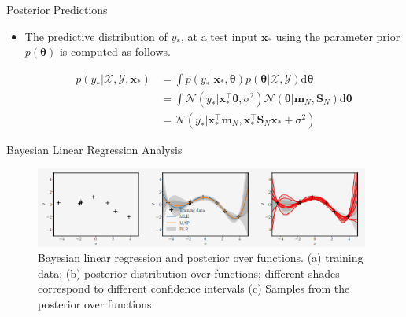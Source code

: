 \documentclass{beamer}
\begin{document}
\begin{frame}{Posterior Predictions}
\begin{itemize}[<+->]
\item The predictive distribution of $y_{*}$, at a test input $\boldsymbol{x}_{*}$ using the parameter prior $p(\boldsymbol{\theta})$ is computed as follows.

\begin{equation*}
\begin{aligned}
p\left(y_{*} | \mathcal{X}, \mathcal{Y}, \boldsymbol{x}_{*}\right) &=\int p\left(y_{*} | \boldsymbol{x}_{*}, \boldsymbol{\theta}\right) p(\boldsymbol{\theta} | \mathcal{X}, \mathcal{Y}) \mathrm{d} \boldsymbol{\theta} \\
&=\int \mathcal{N}\left(y_{*} | \boldsymbol{x}_{*}^{\top} \boldsymbol{\theta}, \sigma^{2}\right) \mathcal{N}\left(\boldsymbol{\theta} | \boldsymbol{m}_{N}, \boldsymbol{S}_{N}\right) \mathrm{d} \boldsymbol{\theta} \\
&=\mathcal{N}\left(y_{*} | \boldsymbol{x}_{*}^{\top} \boldsymbol{m}_{N}, \boldsymbol{x}_{*}^{\top} \boldsymbol{S}_{N} \boldsymbol{x}_{*}+\sigma^{2}\right)
\end{aligned}
\end{equation*}

\end{itemize}
\end{frame}

\begin{frame}{Bayesian Linear Regression Analysis}

\begin{figure}[htp]
\centering
\includegraphics[width=11cm]{figures/blrfig1.png}
\caption{Bayesian linear regression and posterior over functions. (a) training data; (b) posterior distribution over functions; different shades correspond to different confidence intervals (c) Samples from the posterior over functions.}
\label{fig:blrfig1}
\end{figure}

\end{frame}
\end{document}
